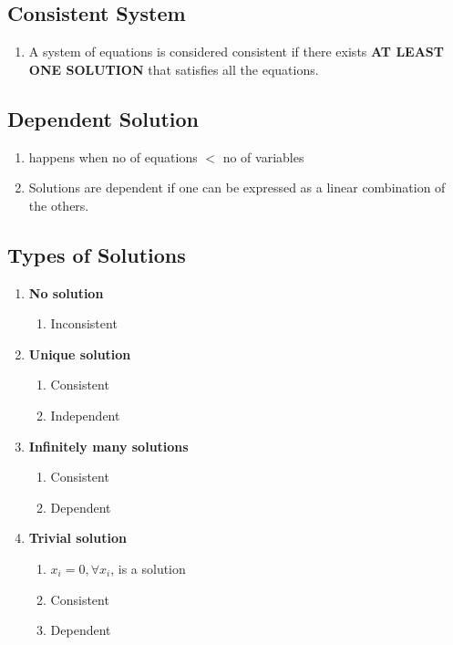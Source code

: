 \subsection{Consistent System}\label{Consistent System of equations}

\begin{enumerate}
    \item A system of equations is considered consistent if there exists \textbf{AT LEAST ONE SOLUTION} that satisfies all the equations.
\end{enumerate}


\subsection{Dependent Solution}\label{Dependent Solution of linear equations}

\begin{enumerate}
    \item happens when no of equations $<$ no of variables
    
    \item Solutions are dependent if one can be expressed as a linear combination of the others.
\end{enumerate}

\subsection{Types of Solutions}
\begin{enumerate}
    \item \textbf{No solution}
    \begin{enumerate}
        \item Inconsistent
    \end{enumerate}
    
    \item \textbf{Unique solution}
    \begin{enumerate}
        \item Consistent
        \item Independent
    \end{enumerate}

    \item \textbf{Infinitely many solutions}
    \begin{enumerate}
        \item Consistent
        \item Dependent
    \end{enumerate}

    \item \textbf{Trivial solution}
    \begin{enumerate}
        \item $x_i = 0, \forall x_i$, is a solution
        \item Consistent
        \item Dependent
    \end{enumerate}

\end{enumerate}


